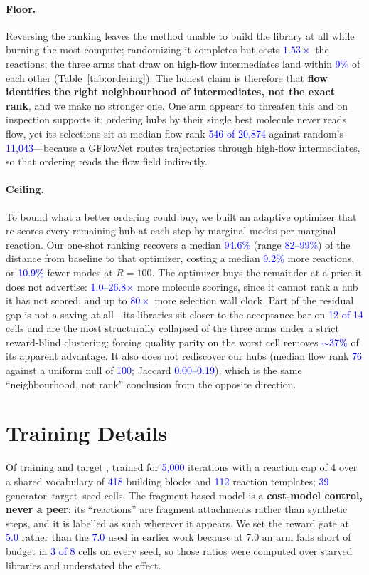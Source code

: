 \documentclass{article}
\newcommand{\checkval}[1]{\textcolor{blue}{#1}}
\begin{document}
\paragraph{Floor.}
Reversing the ranking leaves the method unable to build the library at all while burning the most compute; randomizing it completes but costs \checkval{$1.53\times$} the reactions; the three arms that draw on high-flow intermediates land within \checkval{9\%} of each other (Table~\ref{tab:ordering}). The honest claim is therefore that \textbf{flow identifies the right neighbourhood of intermediates, not the exact rank}, and we make no stronger one.
One arm appears to threaten this and on inspection supports it: ordering hubs by their single best molecule never reads flow, yet its selections sit at median flow rank \checkval{546 of 20{,}874} against random's \checkval{11{,}043}---because a GFlowNet routes trajectories through high-flow intermediates, so that ordering reads the flow field indirectly.

\paragraph{Ceiling.}
To bound what a better ordering could buy, we built an adaptive optimizer that re-scores every remaining hub at each step by marginal modes per marginal reaction. Our one-shot ranking recovers a median \checkval{94.6\%} (range \checkval{82--99\%}) of the distance from baseline to that optimizer, costing a median \checkval{9.2\%} more reactions, or \checkval{10.9\%} fewer modes at $R = 100$. The optimizer buys the remainder at a price it does not advertise: \checkval{1.0--26.8$\times$} more molecule scorings, since it cannot rank
a hub it has not scored, and up to \checkval{$80\times$} more selection wall clock. Part of the residual gap is not a saving at all---its libraries sit closer to the acceptance bar on \checkval{12 of 14} cells and are the most structurally collapsed of the three arms under a strict reward-blind clustering; forcing quality parity on the worst cell removes \checkval{$\sim$37\%} of its apparent advantage. It also does not rediscover our hubs (median flow rank \checkval{76} against a uniform null of \checkval{100}; Jaccard \checkval{0.00--0.19}), which is the same ``neighbourhood, not rank'' conclusion from the opposite direction.


\section{Training Details}
\label{app:training}
Of training and target , trained for \checkval{5{,}000} iterations with a reaction cap of 4 over a shared vocabulary of \checkval{418} building blocks and \checkval{112} reaction templates; \checkval{39} generator--target--seed cells. The fragment-based model is a \textbf{cost-model control, never a peer}: its ``reactions'' are fragment attachments rather than synthetic steps, and it is labelled as such wherever it appears. We set the reward gate at \checkval{5.0} rather than the \checkval{7.0} used in earlier work because at 7.0 an arm falls short of budget in \checkval{3 of 8} cells on every seed, so those ratios were computed over starved libraries and understated the effect.
\end{document}
